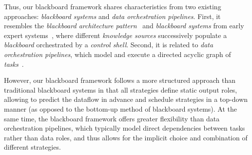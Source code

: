 Thus, our blackboard framework shares characteristics from two existing approaches: \emph{blackboard systems} and \emph{data orchestration pipelines}.
First, it resembles the \emph{blackboard architecture pattern}~\cite[p.~71ff.]{buschmann1996pattern} and \emph{blackboard systems} from early expert systems~\cite{hayes1985blackboard}, where different \emph{knowledge sources} successively populate a \emph{blackboard} orchestrated by a \emph{control shell}.
Second, it is related to \emph{data orchestration pipelines}, which model and execute a directed acyclic graph of \emph{tasks}~\cite{talia2013workflow}.

However, our blackboard framework follows a more structured approach than traditional blackboard systems in that all strategies define static output roles, allowing to predict the dataflow in advance and schedule strategies in a top-down manner (as opposed to the bottom-up method of blackboard systems).
At the same time, the blackboard framework offers greater flexibility than data orchestration pipelines, which typically model direct dependencies between tasks rather than data roles, and thus allows for the implicit choice and combination of different strategies.
